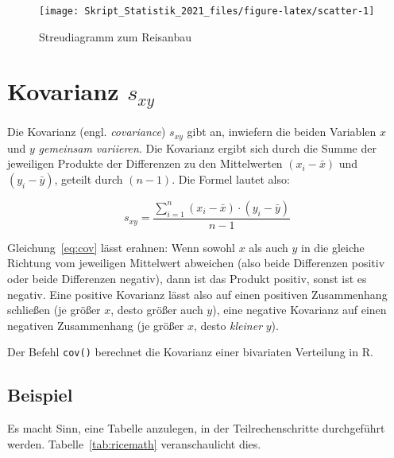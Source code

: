 \documentclass[
  11pt,
  ngerman,
  a4paper,
]{report}
\newenvironment{rtip}{
  \medskip
  \begin{tcolorbox}[colframe=purple,colback=light_gray,title=Softwarehinweis]
}{
  \end{tcolorbox}
  \medskip
}
\begin{document}
\begin{figure}[!h]

{\centering \texttt{[image: Skript\_Statistik\_2021\_files/figure-latex/scatter-1]} 

}

\caption{Streudiagramm zum Reisanbau}\label{fig:scatter}
\end{figure}

\hypertarget{kovarianz}{%
\section{\texorpdfstring{Kovarianz \(s_{xy}\)}{Kovarianz s\_\{xy\}}}\label{kovarianz}}

Die Kovarianz (engl. \emph{covariance}) \(s_{xy}\) gibt an, inwiefern die beiden Variablen \(x\) und \(y\) \emph{gemeinsam variieren}. Die Kovarianz ergibt sich durch die Summe der jeweiligen Produkte der Differenzen zu den Mittelwerten \((x_i-\bar{x})\) und \((y_i-\bar{y})\), geteilt durch \((n-1)\). Die Formel lautet also:

\[
s_{xy}=\frac{\sum\limits^n_{i=1}(x_i-\bar{x})\cdot(y_i-\bar{y})}{n-1}
\label{eq:cov}
\]

Gleichung~\eqref{eq:cov} lässt erahnen: Wenn sowohl \(x\) als auch \(y\) in die gleiche Richtung vom jeweiligen Mittelwert abweichen (also beide Differenzen positiv oder beide Differenzen negativ), dann ist das Produkt positiv, sonst ist es negativ. Eine positive Kovarianz lässt also auf einen positiven Zusammenhang schließen (je größer \(x\), desto größer auch \(y\)), eine negative Kovarianz auf einen negativen Zusammenhang (je größer \(x\), desto \emph{kleiner} \(y\)).

\begin{rtip}
Der Befehl \verb|cov()| berechnet die Kovarianz einer bivariaten Verteilung in R.
\end{rtip}

\hypertarget{beispiel-24}{%
\subsection{Beispiel}\label{beispiel-24}}

Es macht Sinn, eine Tabelle anzulegen, in der Teilrechenschritte durchgeführt werden. Tabelle~\ref{tab:ricemath} veranschaulicht dies.
\end{document}
